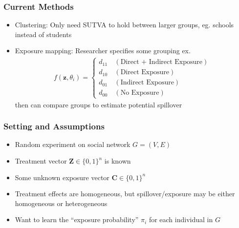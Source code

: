 \documentclass[
	11pt, %
]{beamer}
\begin{document}
\begin{frame}
	\frametitle{Current Methods}
	\begin{itemize}
		\setlength\itemsep{1em}
		\item Clustering: Only need SUTVA to hold between larger groups, eg. schools instead of students 
		\item Exposure mapping: Researcher specifies some grouping ex. \begin{align*}
			f(\mathbf{z}, \theta_i) = \begin{cases}
				d_{11} \ &(\text{Direct + Indirect Exposure}) \\
				d_{10} \ &(\text{Direct Exposure})\\ 
				d_{01} \ &(\text{Indirect Exposure})\\
				d_{00} \ &(\text{No Exposure})
			\end{cases}
		\end{align*}
		then can compare groups to estimate potential spillover 
	\end{itemize}
\end{frame}

\begin{frame}
	\frametitle{Setting and Assumptions}
	\begin{itemize}
		\setlength\itemsep{1em}
		\item Random experiment on social network $G = (V, E)$
		\item Treatment vector $\mathbf{Z} \in \{0, 1\}^{n}$ is known 
		\item Some unknown exposure vector $\mathbf{C} \in \{0, 1\}^{n}$
		\item Treatment effects are homogeneous, but spillover/exposure may be either 
		homogeneous or heterogeneous
		\item Want to learn the ``exposure probability'' $\pi_i$ for each individual in $G$
	\end{itemize}
\end{frame}
\end{document}
